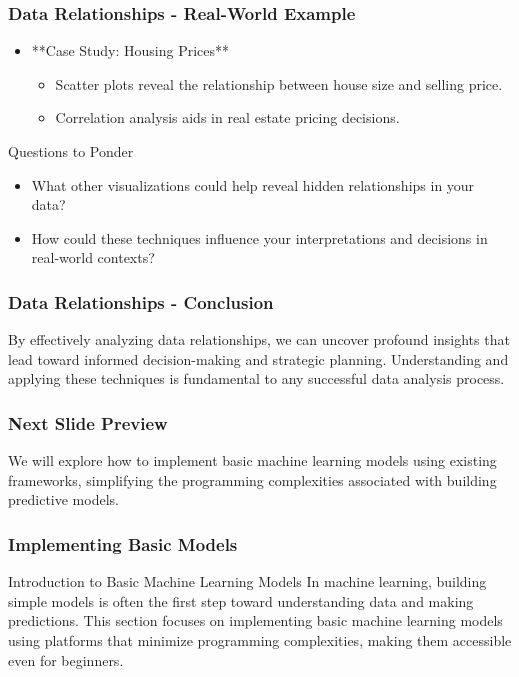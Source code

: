 \documentclass[aspectratio=169]{beamer}
\begin{document}
\begin{frame}[fragile]
  \frametitle{Data Relationships - Real-World Example}

  \begin{itemize}
    \item **Case Study: Housing Prices**
      \begin{itemize}
        \item Scatter plots reveal the relationship between house size and selling price.
        \item Correlation analysis aids in real estate pricing decisions.
      \end{itemize}
  \end{itemize}

  \begin{block}{Questions to Ponder}
    \begin{itemize}
      \item What other visualizations could help reveal hidden relationships in your data?
      \item How could these techniques influence your interpretations and decisions in real-world contexts?
    \end{itemize}
  \end{block}

\end{frame}

\begin{frame}[fragile]
  \frametitle{Data Relationships - Conclusion}

  By effectively analyzing data relationships, we can uncover profound insights that lead toward informed decision-making and strategic planning. Understanding and applying these techniques is fundamental to any successful data analysis process.
  
\end{frame}

\begin{frame}[fragile]
  \frametitle{Next Slide Preview}

  We will explore how to implement basic machine learning models using existing frameworks, simplifying the programming complexities associated with building predictive models.
  
\end{frame}

\begin{frame}[fragile]
    \frametitle{Implementing Basic Models}
    \begin{block}{Introduction to Basic Machine Learning Models}
        In machine learning, building simple models is often the first step toward understanding data and making predictions. This section focuses on implementing basic machine learning models using platforms that minimize programming complexities, making them accessible even for beginners.
    \end{block}
\end{frame}
\end{document}
